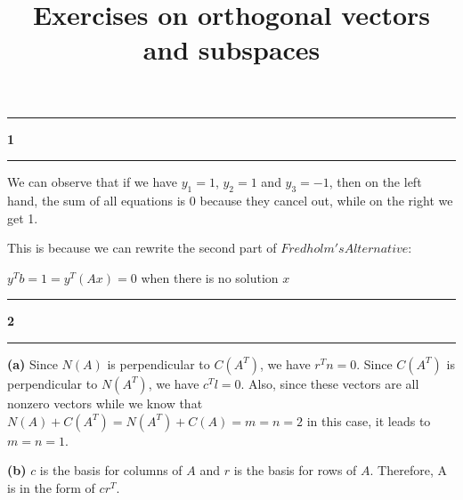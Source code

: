 \documentclass[11pt]{article}
\newcommand\question[2]{\vspace{.25in}\hrule\textbf{#1 #2}\vspace{.5em}\hrule\vspace{.10in}}
\renewcommand\part[1]{\vspace{.10in}\textbf{(#1)}}
\begin{document}
\raggedright
\newcommand\NAME{Haiying Cui}  %
\newcommand\ANDREWID{Christy}     %
\newcommand\HWNUM{16}              %

\title{Exercises on orthogonal vectors and subspaces}
\maketitle

\question{1}{}
We can observe that if we have \(y_1 = 1\), \(y_2 = 1\) and \(y_3 = -1\), then on the left hand, the sum of all equations is 0 because they cancel out, while on the right we get 1. 

This is because we can rewrite the second part of \(Fredholm's Alternative\):

\(y^Tb = 1 = y^T(Ax) = 0\) when there is no solution \(x\)

\question{2}{}
\part{a}{}
Since \(N(A)\) is perpendicular to \(C(A^T)\), we have \(r^Tn = 0\). Since \(C(A^T)\) is perpendicular to \(N(A^T)\), we have \(c^Tl = 0\). Also, since these vectors are all nonzero vectors while we know that \(N(A) + C(A^T) = N(A^T) + C(A) = m = n = 2\) in this case, it leads to \(m = n = 1\).

\part{b}{}
\(c\) is the basis for columns of \(A\) and \(r\) is the basis for rows of \(A\). Therefore, A is in the form of \(cr^T\).
\end{document}

